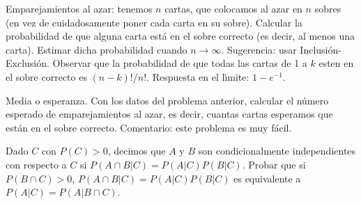 \begin{problem}[11] Emparejamientos al azar: tenemos $n$ cartas, que colocamos al azar en $n$ sobres
(en vez de cuidadosamente poner cada carta en su sobre).
Calcular la probabilidad de que alguna carta est\'a en el sobre correcto
(es decir, al menos una carta). Estimar dicha probabilidad cuando
$n\to\infty$. Sugerencia: usar Inclusi\'on-Exclusi\'on.
Observar que la probabilidad de que todas las cartas de 1 a $k$ esten en el sobre correcto
es $(n-k)!/n!$. Respuesta en el l\'{\i}mite: $1 - e^{-1}$.
\solution

\begin{expla}

\end{expla}




\end{problem}


\begin{problem}[12] Media o esperanza. Con los datos del problema anterior, calcular el n\'umero esperado de
emparejamientos al azar, es decir, cuantas cartas esperamos que est\'an en el sobre correcto.
Comentario: este problema es muy f\'acil.
\solution

\begin{expla}

\end{expla}

\end{problem}


\begin{problem}[13] Dado $C$ con $P(C) > 0$, decimos que $A$ y $B$ son condicionalmente independientes
con respecto a $C$ si $P(A\cap B|C) =P(A|C) P(B|C)$. Probar que si  $P(B\cap C) > 0$, 
$P(A\cap B|C) =P(A|C) P(B|C)$ es equivalente a $P(A|C) = P(A|B \cap C)$. 


\solution

\begin{expla}

\end{expla}

\end{problem}


